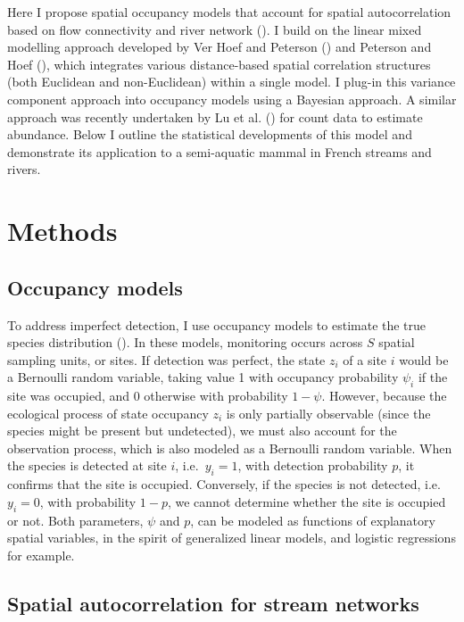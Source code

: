 \documentclass[
  11pt,
  a4paper,
]{article}
\begin{document}
Here I propose spatial occupancy models that account for spatial autocorrelation based on flow connectivity and river network (). I build on the linear mixed modelling approach developed by Ver Hoef and Peterson () and Peterson and Hoef (), which integrates various distance-based spatial correlation structures (both Euclidean and non-Euclidean) within a single model. I plug-in this variance component approach into occupancy models using a Bayesian approach. A similar approach was recently undertaken by Lu et al. () for count data to estimate abundance. Below I outline the statistical developments of this model and demonstrate its application to a semi-aquatic mammal in French streams and rivers.

\section{Methods}\label{methods}

\subsection{Occupancy models}\label{occupancy-models}

To address imperfect detection, I use occupancy models to estimate the true species distribution (). In these models, monitoring occurs across \(S\) spatial sampling units, or sites. If detection was perfect, the state \(z_i\) of a site \(i\) would be a Bernoulli random variable, taking value 1 with occupancy probability \(\psi_i\) if the site was occupied, and 0 otherwise with probability \(1-\psi\). However, because the ecological process of state occupancy \(z_i\) is only partially observable (since the species might be present but undetected), we must also account for the observation process, which is also modeled as a Bernoulli random variable. When the species is detected at site \(i\), i.e.~\(y_i = 1\), with detection probability \(p\), it confirms that the site is occupied. Conversely, if the species is not detected, i.e.~\(y_i = 0\), with probability \(1-p\), we cannot determine whether the site is occupied or not. Both parameters, \(\psi\) and \(p\), can be modeled as functions of explanatory spatial variables, in the spirit of generalized linear models, and logistic regressions for example.

\subsection{Spatial autocorrelation for stream networks}\label{spatial-autocorrelation-for-stream-networks}
\end{document}
